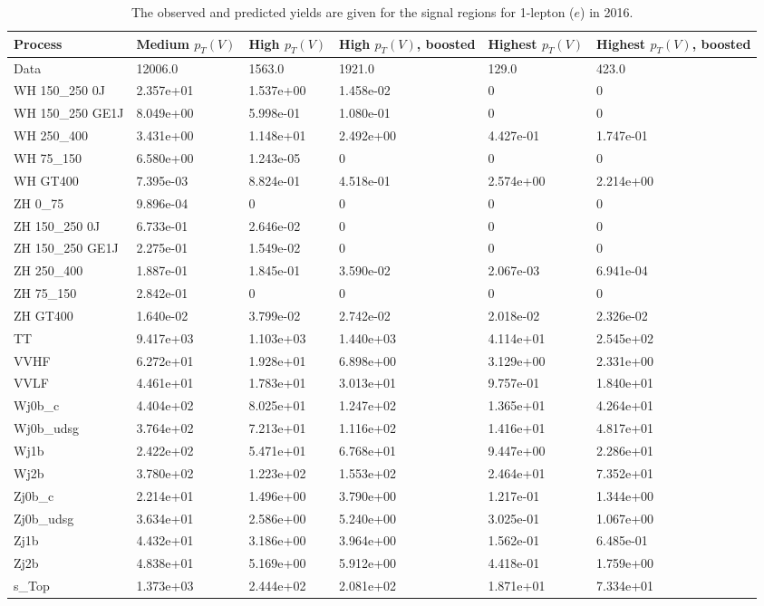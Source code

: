 \begin{table}
\centering
\caption[2016 1-lepton ($e$) signal selection yields]{
                  The observed and predicted yields are given for the
                  signal regions for 1-lepton ($e$) in 2016.
                  }
{\footnotesize
\begin{tabularx}{\textwidth}{|X|X|X|X|X|X|}
\hline
Process & Medium $p_{T}(V)$ & High $p_{T}(V)$ & High $p_{T}(V)$, boosted & Highest $p_{T}(V)$ & Highest $p_{T}(V)$, boosted \\
\hline
Data & 12006.0 & 1563.0 & 1921.0 & 129.0 & 423.0 \\
\hline
WH 150\_250 0J & 2.357e+01 & 1.537e+00 & 1.458e-02 & 0 & 0 \\
WH 150\_250 GE1J & 8.049e+00 & 5.998e-01 & 1.080e-01 & 0 & 0 \\
WH 250\_400 & 3.431e+00 & 1.148e+01 & 2.492e+00 & 4.427e-01 & 1.747e-01 \\
WH 75\_150 & 6.580e+00 & 1.243e-05 & 0 & 0 & 0 \\
WH GT400 & 7.395e-03 & 8.824e-01 & 4.518e-01 & 2.574e+00 & 2.214e+00 \\
ZH 0\_75 & 9.896e-04 & 0 & 0 & 0 & 0 \\
ZH 150\_250 0J & 6.733e-01 & 2.646e-02 & 0 & 0 & 0 \\
ZH 150\_250 GE1J & 2.275e-01 & 1.549e-02 & 0 & 0 & 0 \\
ZH 250\_400 & 1.887e-01 & 1.845e-01 & 3.590e-02 & 2.067e-03 & 6.941e-04 \\
ZH 75\_150 & 2.842e-01 & 0 & 0 & 0 & 0 \\
ZH GT400 & 1.640e-02 & 3.799e-02 & 2.742e-02 & 2.018e-02 & 2.326e-02 \\
\hline
TT & 9.417e+03 & 1.103e+03 & 1.440e+03 & 4.114e+01 & 2.545e+02 \\
VVHF & 6.272e+01 & 1.928e+01 & 6.898e+00 & 3.129e+00 & 2.331e+00 \\
VVLF & 4.461e+01 & 1.783e+01 & 3.013e+01 & 9.757e-01 & 1.840e+01 \\
Wj0b\_c & 4.404e+02 & 8.025e+01 & 1.247e+02 & 1.365e+01 & 4.264e+01 \\
Wj0b\_udsg & 3.764e+02 & 7.213e+01 & 1.116e+02 & 1.416e+01 & 4.817e+01 \\
Wj1b & 2.422e+02 & 5.471e+01 & 6.768e+01 & 9.447e+00 & 2.286e+01 \\
Wj2b & 3.780e+02 & 1.223e+02 & 1.553e+02 & 2.464e+01 & 7.352e+01 \\
Zj0b\_c & 2.214e+01 & 1.496e+00 & 3.790e+00 & 1.217e-01 & 1.344e+00 \\
Zj0b\_udsg & 3.634e+01 & 2.586e+00 & 5.240e+00 & 3.025e-01 & 1.067e+00 \\
Zj1b & 4.432e+01 & 3.186e+00 & 3.964e+00 & 1.562e-01 & 6.485e-01 \\
Zj2b & 4.838e+01 & 5.169e+00 & 5.912e+00 & 4.418e-01 & 1.759e+00 \\
s\_Top & 1.373e+03 & 2.444e+02 & 2.081e+02 & 1.871e+01 & 7.334e+01 \\
\hline
\end{tabularx}
}
\label{tab:sr-Wen-2016}
\end{table}

